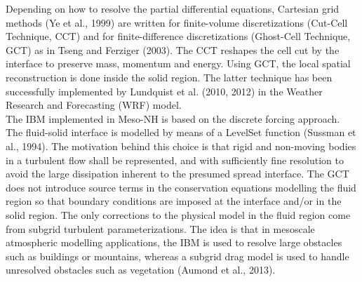 Depending on how to resolve the partial differential equations, Cartesian grid methods 
(Ye et al., 1999) are written for finite-volume discretizations (Cut-Cell Technique, CCT) 
and for finite-difference discretizations (Ghost-Cell Technique, GCT) as in 
Tseng and Ferziger (2003). The CCT reshapes the cell cut by the interface to preserve mass, 
momentum and energy. Using GCT, the local spatial reconstruction is done inside the 
solid region. The latter technique has been successfully implemented by Lundquist et al. (2010, 2012)
in the Weather Research and Forecasting (WRF) model. \\
%
The IBM implemented in Meso-NH is based on the discrete forcing approach. 
The fluid-solid interface is modelled by means of a LevelSet function 
(Sussman et al., 1994). The motivation behind this choice is that rigid 
and non-moving bodies in a turbulent flow shall be represented, and with 
sufficiently fine resolution to avoid the large dissipation inherent to 
the presumed spread interface. The GCT does not introduce source terms in 
the conservation equations modelling the fluid region so that boundary conditions 
are imposed at the interface and/or in the solid region. The only corrections 
to the physical model in the fluid region come from subgrid turbulent parameterizations. 
The idea is that in mesoscale atmospheric modelling applications, the IBM is 
used to resolve large obstacles such as buildings or mountains, whereas a 
subgrid drag model is used to handle unresolved obstacles 
such as vegetation (Aumond et al., 2013).
%
